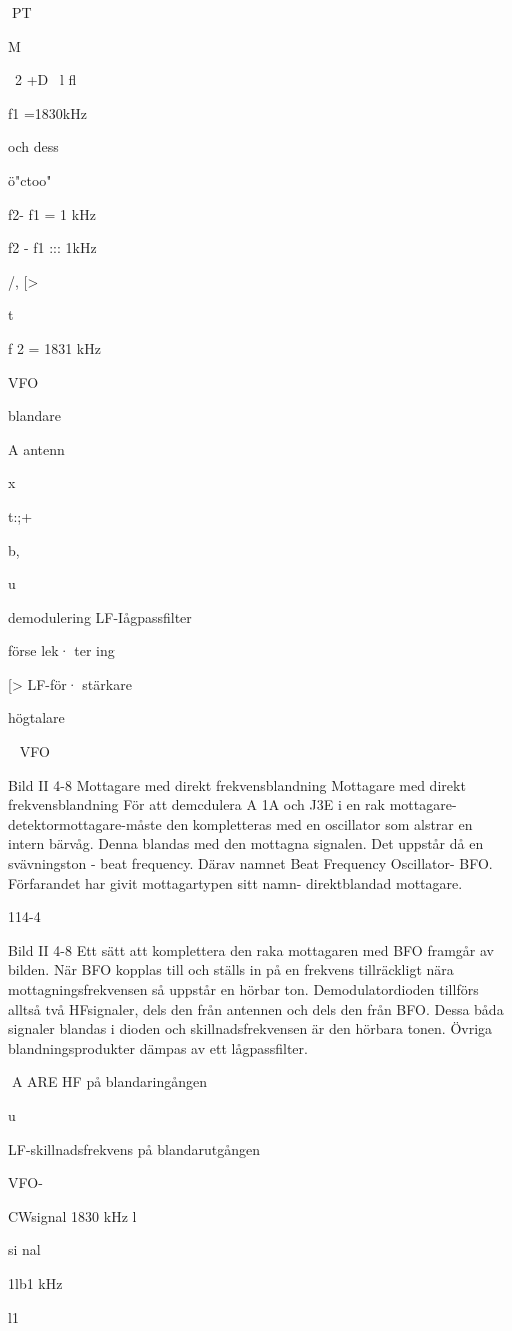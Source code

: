 \documentclass[a4paper,twoside,twocolumn,openright]{book}
\begin{document}
{{{PT

M

~2 +D
~l
fl

f1 =1830kHz

och dess

ö"ctoo"

f2- f1 = 1 kHz

f2 - f1 ::: 1kHz

/,
[>

t
~

f 2 = 1831 kHz

VFO

blandare

A
antenn

x

t:;+

b,

u

demodulering LF-Iågpassfilter

förse lek·
ter ing

[>
LF-för·
stärkare

högtalare

~
VFO

Bild II 4-8 Mottagare med direkt frekvensblandning
Mottagare med direkt frekvensblandning
För att demcdulera A 1A och J3E i en rak
mottagare- detektormottagare-måste den
kompletteras med en oscillator som alstrar
en intern bärvåg. Denna blandas med den
mottagna signalen. Det uppstår då en svävningston - beat frequency. Därav namnet
Beat Frequency Oscillator- BFO.
Förfarandet har givit mottagartypen sitt
namn- direktblandad mottagare.

114-4

Bild II 4-8
Ett sätt att komplettera den raka mottagaren
med BFO framgår av bilden. När BFO kopplas till och ställs in på en frekvens tillräckligt
nära mottagningsfrekvensen så uppstår en
hörbar ton.
Demodulatordioden tillförs alltså två HFsignaler, dels den från antennen och dels
den från BFO. Dessa båda signaler blandas
i dioden och skillnadsfrekvensen är den
hörbara tonen. Övriga blandningsprodukter
dämpas av ett lågpassfilter.

A ARE
HF på blandaringången

u~

LF-skillnadsfrekvens på
blandarutgången

VFO-

CWsignal
1830 kHz
l

si nal

1lb1 kHz

l1

}}}
\end{document}

